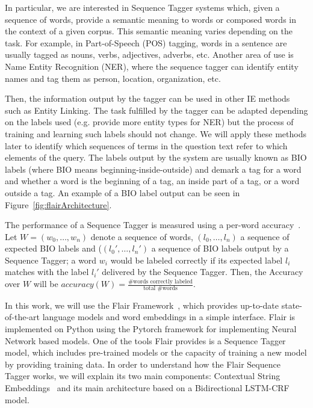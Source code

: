 In particular, we are interested in Sequence Tagger systems which, given a sequence of 
words, provide a semantic meaning to words or composed words in the context of a given 
corpus. This semantic meaning varies depending on the task. For example, in Part-of-Speech 
(POS) tagging, words in a sentence are usually tagged as nouns, verbs, adjectives, adverbs, 
etc. Another area of use is Name Entity Recognition (NER), where the sequence tagger can 
identify entity names and tag them as person, location, organization, etc. 

Then, the information output by the tagger can be used in other IE methods such as Entity 
Linking. The task fulfilled by the tagger can be adapted depending on the labels used 
(e.g. provide more entity types for NER) but the process of training and learning such 
labels should not change. We will apply these methods later to identify which sequences of 
terms in the question text refer to which elements of the query. The labels output by the 
system are usually known as BIO labels (where BIO means beginning-inside-outside) and 
demark a tag for a word and whether a word is the beginning of a tag, an inside part of a 
tag, or a word outside a tag. An example of a BIO label output can be seen in 
Figure~\ref{fig:flairArchitecture}.

The performance of a Sequence Tagger is measured using a per-word accuracy~\cite{seqlab:MarcusSM94}. 
Let $W=(w_0,\ldots,w_n)$ denote a sequence of words, $(l_0,\ldots,l_n)$ a sequence of 
expected BIO labels and ($(l_{0}',\ldots,l_{n}')$ a sequence of BIO labels output by a Sequence 
Tagger; a word $w_i$ would be labeled correctly if its expected label $l_i$ matches with the label 
$l_{i}'$ delivered by the Sequence Tagger. Then, the Accuracy over $W$ will be $accuracy(W)=
\frac{\mbox{\#words correctly labeled}}{\mbox{total \# words}}$.

In this work, we will use the Flair Framework~\cite{seqlab:flair-AkbikBBRSV19}, which provides 
up-to-date state-of-the-art language models and word embeddings in a simple interface. Flair is 
implemented on Python using the Pytorch framework for implementing Neural Network based models. 
One of the tools Flair provides is a Sequence Tagger model, which includes pre-trained models or 
the capacity of training a new model by providing training data. In order to understand how the 
Flair Sequence Tagger works, we will explain its two main components: Contextual String 
Embeddings~\cite{seqlab:contextual-emb-AkbikBV18} and its main architecture based on a 
Bidirectional LSTM-CRF model.

